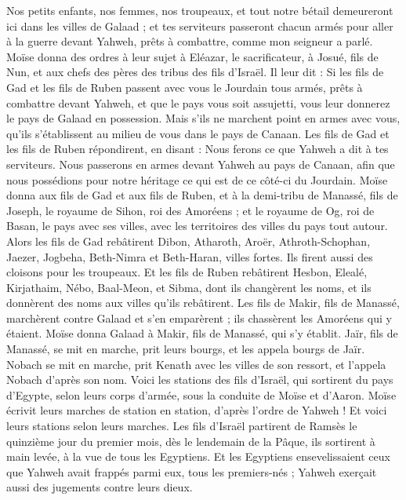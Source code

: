 \begin{multicols}{2}
Nos petits enfants, nos femmes, nos troupeaux, et tout notre bétail demeureront ici dans les villes de Galaad ;
et tes serviteurs passeront chacun armés pour aller à la guerre devant Yahweh, prêts à combattre, comme mon seigneur a parlé.
Moïse donna des ordres à leur sujet à Eléazar, le sacrificateur, à Josué, fils de Nun, et aux chefs des pères des tribus des fils d'Israël.
Il leur dit : Si les fils de Gad et les fils de Ruben passent avec vous le Jourdain tous armés, prêts à combattre devant Yahweh, et que le pays vous soit assujetti, vous leur donnerez le pays de Galaad en possession.
Mais s'ils ne marchent point en armes avec vous, qu’ils s’établissent au milieu de vous dans le pays de Canaan.
Les fils de Gad et les fils de Ruben répondirent, en disant : Nous ferons ce que Yahweh a dit à tes serviteurs.
Nous passerons en armes devant Yahweh au pays de Canaan, afin que nous possédions pour notre héritage ce qui est de ce côté-ci du Jourdain.
Moïse donna aux fils de Gad et aux fils de Ruben, et à la demi-tribu de Manassé, fils de Joseph, le royaume de Sihon, roi des Amoréens ; et le royaume de Og, roi de Basan, le pays avec ses villes, avec les territoires des villes du pays tout autour.
Alors les fils de Gad rebâtirent Dibon, Atharoth, Aroër,
Athroth-Schophan, Jaezer, Jogbeha,
Beth-Nimra et Beth-Haran, villes fortes. Ils firent aussi des cloisons pour les troupeaux.
Et les fils de Ruben rebâtirent Hesbon, Elealé, Kirjathaim,
Nébo, Baal-Meon, et Sibma, dont ils changèrent les noms, et ils donnèrent des noms aux villes qu'ils rebâtirent.
Les fils de Makir, fils de Manassé, marchèrent contre Galaad et s’en emparèrent ; ils chassèrent les Amoréens qui y étaient.
Moïse donna Galaad à Makir, fils de Manassé, qui s’y établit.
Jaïr, fils de Manassé, se mit en marche, prit leurs bourgs, et les appela bourgs de Jaïr.
Nobach se mit en marche, prit Kenath avec les villes de son ressort, et l'appela Nobach d’après son nom.
\VerseOne{}Voici les stations des fils d'Israël, qui sortirent du pays d'Egypte, selon leurs corps d’armée, sous la conduite de Moïse et d'Aaron.
Moïse écrivit leurs marches de station en station, d’après l’ordre de Yahweh ! Et voici leurs stations selon leurs marches.
Les fils d'Israël partirent de Ramsès le quinzième jour du premier mois, dès le lendemain de la Pâque, ils sortirent à main levée, à la vue de tous les Egyptiens.
Et les Egyptiens ensevelissaient ceux que Yahweh avait frappés parmi eux, tous les premiers-nés ; Yahweh exerçait aussi des jugements contre leurs dieux.

\end{multicols}
